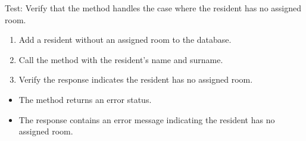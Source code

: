 \documentclass[letterpaper,10pt,english]{sphinxmanual}
\begin{document}
\begin{fulllineitems}
\label{\detokenize{test:test.test_residetnt.test_get_resident_room_no_room_assigned}}
\pysigstartsignatures
\pysiglinewithargsret
{}
{}
{}
\pysigstopsignatures
\sphinxAtStartPar
Test: Verify that the method handles the case where the resident has no assigned room.
\begin{description}
\begin{enumerate}
%
\item {} 
\sphinxAtStartPar
Add a resident without an assigned room to the database.

\item {} 
\sphinxAtStartPar
Call the  method with the resident’s name and surname.

\item {} 
\sphinxAtStartPar
Verify the response indicates the resident has no assigned room.

\end{enumerate}

\begin{itemize}
\item {} 
\sphinxAtStartPar
The method returns an error status.

\item {} 
\sphinxAtStartPar
The response contains an error message indicating the resident has no assigned room.

\end{itemize}

\end{description}

\end{fulllineitems}

\end{document}
